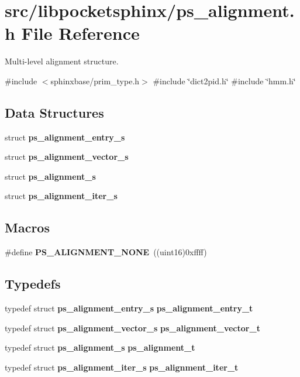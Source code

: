 \section{src/libpocketsphinx/ps\+\_\+alignment.h File Reference}
\label{ps__alignment_8h}


Multi-\/level alignment structure.  


{\ttfamily \#include $<$sphinxbase/prim\+\_\+type.\+h$>$}\newline
{\ttfamily \#include \char`\"{}dict2pid.\+h\char`\"{}}\newline
{\ttfamily \#include \char`\"{}hmm.\+h\char`\"{}}\newline
\subsection*{Data Structures}
\begin{DoxyCompactItemize}
\item 
struct \textbf{ ps\+\_\+alignment\+\_\+entry\+\_\+s}
\item 
struct \textbf{ ps\+\_\+alignment\+\_\+vector\+\_\+s}
\item 
struct \textbf{ ps\+\_\+alignment\+\_\+s}
\item 
struct \textbf{ ps\+\_\+alignment\+\_\+iter\+\_\+s}
\end{DoxyCompactItemize}
\subsection*{Macros}
\begin{DoxyCompactItemize}
\item 
\mbox{\label{ps__alignment_8h_aa6ddcfcd7598f1b50582dd5489e63e50}} 
\#define {\bfseries P\+S\+\_\+\+A\+L\+I\+G\+N\+M\+E\+N\+T\+\_\+\+N\+O\+NE}~((uint16)0xffff)
\end{DoxyCompactItemize}
\subsection*{Typedefs}
\begin{DoxyCompactItemize}
\item 
\mbox{\label{ps__alignment_8h_abf89e73906a29024da48581f645e3c98}} 
typedef struct \textbf{ ps\+\_\+alignment\+\_\+entry\+\_\+s} {\bfseries ps\+\_\+alignment\+\_\+entry\+\_\+t}
\item 
\mbox{\label{ps__alignment_8h_a57f06576e882630108c834e1a53a46d7}} 
typedef struct \textbf{ ps\+\_\+alignment\+\_\+vector\+\_\+s} {\bfseries ps\+\_\+alignment\+\_\+vector\+\_\+t}
\item 
\mbox{\label{ps__alignment_8h_a62983def0c01226bda91e6794a7f61f1}} 
typedef struct \textbf{ ps\+\_\+alignment\+\_\+s} {\bfseries ps\+\_\+alignment\+\_\+t}
\item 
\mbox{\label{ps__alignment_8h_afe48426a7d6bd0d7af628c4efc877ad8}} 
typedef struct \textbf{ ps\+\_\+alignment\+\_\+iter\+\_\+s} {\bfseries ps\+\_\+alignment\+\_\+iter\+\_\+t}
\end{DoxyCompactItemize}
